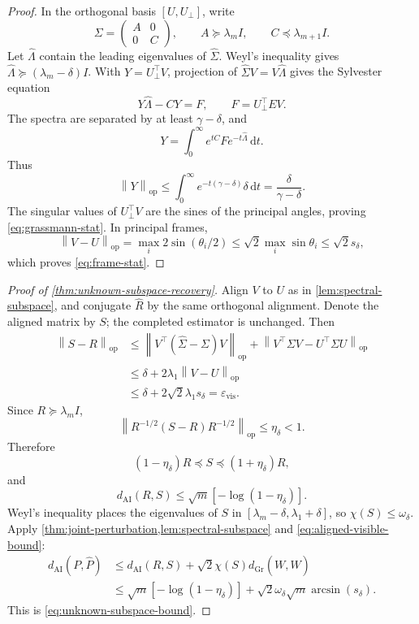 \documentclass[10pt]{article}
\theoremstyle{plain}
\theoremstyle{definition}
\theoremstyle{remark}
\newcommand{\AI}{\mathrm{AI}}
\newcommand{\Gr}{\mathrm{Gr}}
\newcommand{\opnorm}[1]{\left\lVert #1\right\rVert_{\operatorname{op}}}
\newcommand{\dd}{\mathrm d}
\newcommand{\dai}{d_{\AI}}
\newcommand{\dgr}{d_{\Gr}}
\newcommand{\Rhat}{\widehat R}
\newcommand{\Phat}{\widehat P}
\newcommand{\Sigmahat}{\widehat\Sigma}
\begin{document}
\begin{proof}
In the orthogonal basis \([U,U_\perp]\), write
\[
  \Sigma=\begin{pmatrix}A&0\\0&C\end{pmatrix},
  \qquad A\succeq\lambda_mI,
  \qquad C\preceq\lambda_{m+1}I.
\]
Let \(\widehat\Lambda\) contain the leading eigenvalues of \(\Sigmahat\).
Weyl's inequality gives
\(\widehat\Lambda\succeq(\lambda_m-\delta)I\).  With
\(Y=U_\perp^\top V\), projection of
\(\Sigmahat V=V\widehat\Lambda\) gives the Sylvester equation
\[
  Y\widehat\Lambda-CY=F,
  \qquad F=U_\perp^\top EV.
\]
The spectra are separated by at least \(\gamma-\delta\), and
\[
  Y=\int_0^\infty e^{tC}Fe^{-t\widehat\Lambda}\,\dd t.
\]
Thus
\[
  \opnorm Y
  \le\int_0^\infty e^{-t(\gamma-\delta)}\delta\,\dd t
  =\frac{\delta}{\gamma-\delta}.
\]
The singular values of \(U_\perp^\top V\) are the sines of the principal
angles, proving \eqref{eq:grassmann-stat}.  In principal frames,
\[
  \opnorm{V-U}
  =\max_i2\sin(\theta_i/2)
  \le\sqrt2\max_i\sin\theta_i
  \le\sqrt2s_\delta,
\]
which proves \eqref{eq:frame-stat}.
\end{proof}

\begin{proof}[Proof of \cref{thm:unknown-subspace-recovery}]
Align \(V\) to \(U\) as in \cref{lem:spectral-subspace}, and conjugate
\(\Rhat\) by the same orthogonal alignment.  Denote the aligned matrix by
\(S\); the completed estimator is unchanged.  Then
\begin{align*}
  \opnorm{S-R}
  &\le\opnorm{V^\top(\Sigmahat-\Sigma)V}
  +\opnorm{V^\top\Sigma V-U^\top\Sigma U}\\
  &\le\delta+2\lambda_1\opnorm{V-U}\\
  &\le\delta+2\sqrt2\lambda_1s_\delta
  =\varepsilon_{\mathrm{vis}}.
\end{align*}
Since \(R\succeq\lambda_mI\),
\[
  \opnorm{R^{-1/2}(S-R)R^{-1/2}}
  \le\eta_\delta<1.
\]
Therefore
\[
  (1-\eta_\delta)R\preceq S\preceq(1+\eta_\delta)R,
\]
and
\begin{equation}
  \dai(R,S)\le\sqrt m[-\log(1-\eta_\delta)].
  \label{eq:aligned-visible-bound}
\end{equation}
Weyl's inequality places the eigenvalues of \(S\) in
\([\lambda_m-\delta,\lambda_1+\delta]\), so
\(\chi(S)\le\omega_\delta\).  Apply
\cref{thm:joint-perturbation,lem:spectral-subspace} and
\eqref{eq:aligned-visible-bound}:
\begin{align*}
  \dai(P,\Phat)
  &\le\dai(R,S)+\sqrt2\chi(S)\dgr(W,\widehat W)\\
  &\le\sqrt m[-\log(1-\eta_\delta)]
  +\sqrt2\omega_\delta\sqrt m\arcsin(s_\delta).
\end{align*}
This is \eqref{eq:unknown-subspace-bound}.
\end{proof}
\end{document}
